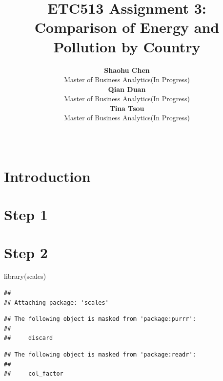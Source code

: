 \documentclass[11pt,a4paper,]{article}
\title{ETC513 Assignment 3: Comparison of Energy and Pollution by Country}
\author{\sf\Large\textbf{ Shaohu Chen}\\ {\sf\large Master of Business Analytics(In Progress)\\[0.5cm]} \sf\Large\textbf{ Qian Duan}\\ {\sf\large Master of Business Analytics(In Progress)\\[0.5cm]} \sf\Large\textbf{ Tina Tsou}\\ {\sf\large Master of Business Analytics(In Progress)\\[0.5cm]}}
\date{\sf\Date~\Month~\Year}
\makeatletter
\newenvironment{Shaded}{\begin{snugshade}}{\end{snugshade}}
\newcommand{\AttributeTok}[1]{\textcolor[rgb]{0.77,0.63,0.00}{#1}}
\newcommand{\DocumentationTok}[1]{\textcolor[rgb]{0.56,0.35,0.01}{\textbf{\textit{#1}}}}
\newcommand{\FunctionTok}[1]{\textcolor[rgb]{0.00,0.00,0.00}{#1}}
\newcommand{\NormalTok}[1]{#1}
\newcommand{\OtherTok}[1]{\textcolor[rgb]{0.56,0.35,0.01}{#1}}
\newcommand{\SpecialCharTok}[1]{\textcolor[rgb]{0.00,0.00,0.00}{#1}}
\newcommand{\StringTok}[1]{\textcolor[rgb]{0.31,0.60,0.02}{#1}}
\def\titlepage{\front{\expandafter{\@title}}{\@author}{\@organization}}
\makeatother
\begin{document}
\titlepage

\section*{Introduction}

\section*{Step 1}

\section*{Step 2}

\begin{Shaded}
\begin{Highlighting}[]
\FunctionTok{library}\NormalTok{(scales)}
\end{Highlighting}
\end{Shaded}

\begin{verbatim}
## 
## Attaching package: 'scales'
\end{verbatim}

\begin{verbatim}
## The following object is masked from 'package:purrr':
## 
##     discard
\end{verbatim}

\begin{verbatim}
## The following object is masked from 'package:readr':
## 
##     col_factor
\end{verbatim}

\begin{Shaded}
\end{Shaded}
\end{document}
